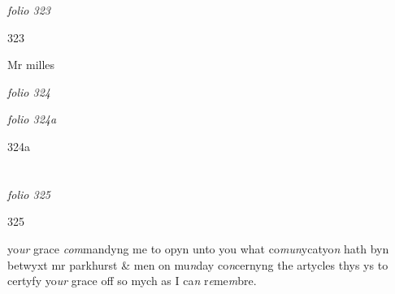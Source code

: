 \documentclass[12pt, a4paper]{book}
\begin{document}
\textit{folio 323}



\begin{flushright}{\color{Mahogany}323}\end{flushright}

		\ifthenelse{\isodd{\thepage}}
		{\reversemarginpar}
		{\normalmarginpar}
		Mr milles

\dotfill
						\newpage
{}

\textit{folio 324}


         \vspace*{4cm}
         
\dotfill
						

\textit{folio 324a}


 	\begin{flushright}{\color{Gray}324a}\end{flushright}

\dotfill
						\newpage {} \section*{}

\textit{folio 325}



\begin{flushright}{\color{Mahogany}325}\end{flushright}

		\ifthenelse{\isodd{\thepage}}
		{\reversemarginpar}
		{\normalmarginpar}
		yo\textit{ur} grace \textit{com}mandyng me to opyn unto you what co\textit{mun}ycatyo\textit{n} hath byn betwyxt mr parkhurst 
\& men on mu\textit{n}day co\textit{n}cernyng the artycles thys ys to certyfy yo\textit{ur }grace off so mych as
I ca\textit{n} r\textit{e}me\textit{m}bre.
\end{document}
